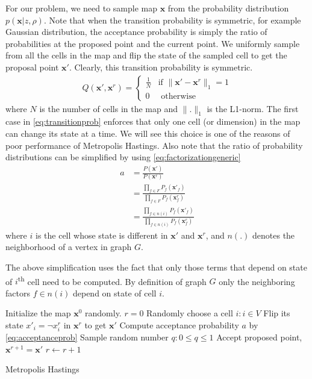 \documentclass[letterpaper, 10 pt, conference]{ieeeconf} %
\newcommand{\vect}[1]{\mathbf{#1}}
\begin{document}
For our problem, we need to sample map $\vect{x}$ from the probability
distribution $p(\vect{x}|z, \rho)$. Note that when the transition probability
is symmetric, for example Gaussian distribution, the acceptance probability is
simply the ratio of probabilities at the proposed point and the current point.
We uniformly sample from all the cells in the map and flip the state of the
sampled cell to get the proposal point $\vect{x}'$. Clearly, this transition probability is symmetric.
\begin{align}
  Q(\vect{x}', \vect{x}^r) = \begin{cases}
    \frac{1}{N} & \text{if $\|\vect{x}' - \vect{x}^r\|_1 = 1$}\\
      0 & \text{ otherwise}
  \end{cases}
  \label{eq:transitionprob}
\end{align}
where $N$ is the number of cells in the map and $\|.\|_1$ is the L1-norm. The
first case in \eqref{eq:transitionprob} enforces that only one cell (or dimension)
in the map
can change its state at a time. We will see this choice is one of the reasons of
poor performance of Metropolis Hastings. Also note that the ratio of probability distributions can be simplified by using \eqref{eq:factorizationgeneric}
\begin{align}
  a &= \frac{P(\vect{x}')}{P(\vect{x}^r)}\\
    &= \frac{\prod_{f \in F} P_f(\vect{x}'_f)}{\prod_{f \in F} P_f(\vect{x}^r_f)}\\
    &= \frac{\prod_{f \in n(i)} P_f(\vect{x}'_f)}{\prod_{f \in n(i)} P_f(\vect{x}^r_f)}
  \label{eq:acceptanceprob}
\end{align}
where $i$ is the cell whose state is different in $\vect{x}'$ and $\vect{x}^r$,
and $n(.)$ denotes the neighborhood of a vertex in graph $G$.

The above simplification uses the fact that only those terms  that depend on
state of $i$\textsuperscript{th} cell need to be computed. By definition
of graph $G$ only the neighboring factors $f \in n(i)$ depend on state of cell $i$.

% 
\begin{algorithm}
  \KwResult{$\vect{x}^r$}
  Initialize the map $\vect{x}^0$ randomly.\;
  $r = 0$\;
   {
    Randomly choose a cell $i : i \in V$\;
    Flip its state $x'_i = \neg x^r_i$ in $\vect{x}^r$ to get $\vect{x}'$\;
    Compute acceptance probability $a$ by \eqref{eq:acceptanceprob}\;
    Sample random number $q : 0 \le q \le 1$\;
     {
      Accept proposed point, $\vect{x}^{r + 1} = \vect{x}'$\;
    } \Else {
      Reject proposed point, $\vect{x}^{r + 1} = \vect{x}^r$\;
    }
    $r \leftarrow r + 1$\;
  }
  \caption{Metropolis Hastings}
\end{algorithm}
\end{document}
